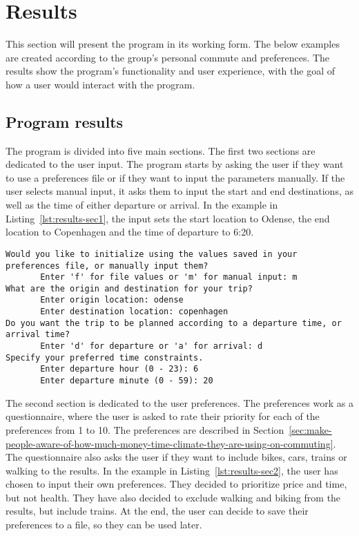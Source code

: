 \section{Results}\label{sec:results}

This section will present the program in its working form.
The below examples are created according to the group's personal commute and preferences.
The results show the program's functionality and user experience, with the goal of how a user would interact with the
program.

\subsection{Program results}\label{subsec:program-results}

The program is divided into five main sections.
The first two sections are dedicated to the user input.
The program starts by asking the user if they want to use a preferences file or if they want to input the parameters
manually.
If the user selects manual input, it asks them to input the start and end destinations, as well as the time of either
departure or arrival.
In the example in Listing~\ref{lst:results-sec1}, the input sets the start location to Odense, the end location to
Copenhagen and the time of departure to 6:20.

\begin{lstlisting}[label={lst:results-sec1}, caption={Basic parameters input.}, captionpos=b, language={}]
Would you like to initialize using the values saved in your preferences file, or manually input them?
       Enter 'f' for file values or 'm' for manual input: m
What are the origin and destination for your trip?
       Enter origin location: odense
       Enter destination location: copenhagen
Do you want the trip to be planned according to a departure time, or arrival time?
       Enter 'd' for departure or 'a' for arrival: d
Specify your preferred time constraints.
       Enter departure hour (0 - 23): 6
       Enter departure minute (0 - 59): 20
\end{lstlisting}

The second section is dedicated to the user preferences.
The preferences work as a questionnaire, where the user is asked to rate their priority for each of the preferences from
1 to 10.
The preferences are described in Section~\ref{sec:make-people-aware-of-how-much-money-time-climate-they-are-using-on-commuting}.
The questionnaire also asks the user if they want to include bikes, cars, trains or walking to the results.
In the example in Listing~\ref{lst:results-sec2}, the user has chosen to input their own preferences.
They decided to prioritize price and time, but not health.
They have also decided to exclude walking and biking from the results, but include trains.
At the end, the user can decide to save their preferences to a file, so they can be used later.


